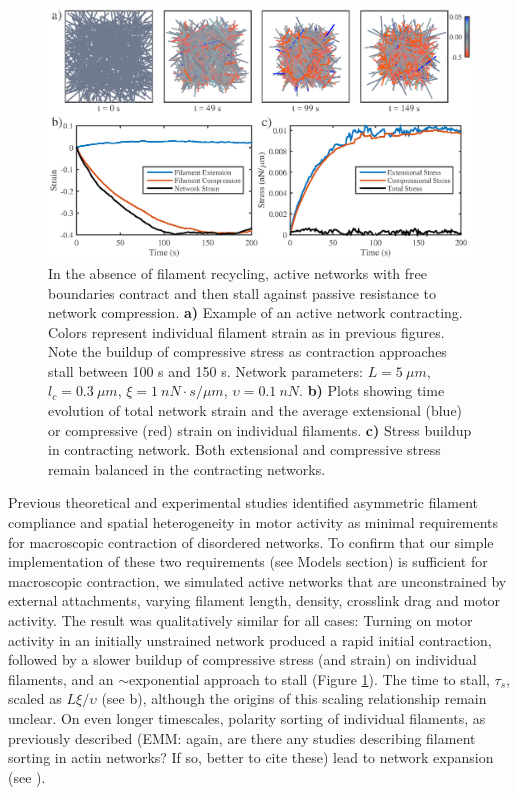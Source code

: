 \documentclass[10pt,letterpaper]{article}
\begin{document}
\begin{figure}[h!]
	\centering
	\includegraphics[width=\hsize]{figures/figure5}
	\caption{\label{fig:active_con} In the absence of filament recycling, active networks with free boundaries contract and then stall against passive resistance to network compression. \textbf{a)}  Example of an active network contracting. Colors represent individual filament strain as in previous figures.  Note the buildup of compressive stress as contraction approaches stall between 100 s and 150 s.  Network parameters: $L=5\: \mu m$, $l_c=0.3\: \mu m$, $\xi=1\: nN\cdot s/\mu m$, $\upsilon=0.1\: nN$.  \textbf{b)} Plots showing time evolution of total network strain and  the average extensional (blue) or compressive (red) strain on individual filaments.   \textbf{c)} Stress buildup in contracting network.  Both extensional and compressive stress remain balanced in the contracting networks.}
\end{figure}

Previous theoretical and experimental studies\cite{1367-2630-14-3-033037,rheo_2D1,rheo_active} identified asymmetric filament compliance and spatial heterogeneity in motor activity  as minimal requirements for macroscopic contraction of disordered networks. To confirm that our simple implementation of these two requirements (see Models section) is sufficient for macroscopic contraction, we simulated active networks that are unconstrained by external attachments, varying filament length, density, crosslink drag and motor activity.  The result was qualitatively similar for all cases:  Turning on motor activity in an initially unstrained network produced a rapid initial contraction, followed by a slower buildup of compressive stress (and strain) on individual filaments, and an $\sim$exponential approach to stall (Figure \ref{fig:active_con}). The time to stall, $\tau_s$, scaled as $L\xi/\upsilon$ (see b), although the origins of this scaling relationship remain unclear. On even longer timescales, polarity sorting of individual filaments, as previously described \cite{Ndlec:1997aa,Surrey1167} (EMM: again, are there any studies describing filament sorting in actin networks? If so, better to cite these) lead to network expansion (see ).
\end{document}
